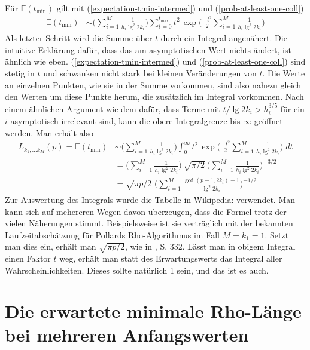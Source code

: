 \documentclass[a4paper, 11pt, ngerman]{article}
\newcommand{\E}{\mathbb{E}}
\begin{document}
Für $\E(t_{\min})$ gilt mit (\ref{expectation-tmin-intermed}) und (\ref{prob-at-least-one-coll})
\begin{align*}
    \E(t_{\min})
     & \sim \Bigg ( \sum_{i = 1}^M \frac 1 {h_i \lg^2 2k_i} \Bigg )
    \sum_{t = 0}^{t_{\max}} t^2 \, \exp \Bigg ( \frac {-t^2} 2
    \sum_{i = 1}^M \frac 1 {h_i \lg^2 2k_i} \Bigg )
\end{align*}
Als letzter Schritt wird die Summe über $t$ durch ein Integral angenähert. Die intuitive Erklärung dafür, dass das am asymptotischen Wert nichts ändert, ist ähnlich wie eben. (\ref{expectation-tmin-intermed}) und (\ref{prob-at-least-one-coll}) sind stetig in $t$ und schwanken nicht stark bei kleinen Veränderungen von $t$. Die Werte an einzelnen Punkten, wie sie in der Summe vorkommen, sind also nahezu gleich den Werten um diese Punkte herum, die zusätzlich im Integral vorkommen. Nach einem ähnlichen Argument wie dem dafür, dass Terme mit $t/\lg 2k_i > h_i^{3/5}$ für ein $i$ asymptotisch irrelevant sind, kann die obere Integralgrenze bis $\infty$ geöffnet werden. Man erhält also
\begin{align}
    L_{k_1, \dots k_M}(p) = \E(t_{\min})
     & \sim \Bigg ( \sum_{i = 1}^M \frac 1 {h_i \lg^2 2k_i} \Bigg )
    \int_{0}^{\infty} t^2 \, \exp \Bigg ( \frac {-t^2} 2
    \sum_{i = 1}^M \frac 1 {h_i \lg^2 2k_i} \Bigg ) \; dt
    \nonumber                                                       \\
     & = \Bigg (\sum_{i = 1}^M \frac 1 {h_i \lg^2 2k_i} \Bigg ) \,
    \sqrt {\pi / 2} \
    \Bigg ( \sum_{i = 1}^M \frac 1 {h_i \lg^2 2k_i} \Bigg )^{-3/2}
    \nonumber                                                       \\
     & = \sqrt{\pi p / 2} \; \Bigg (
    \sum_{i = 1}^M \frac {\gcd(p - 1, 2k_i) - 1} {\lg^2 2k_i} \Bigg )^{-1/2}
    \label{expectation-tmin}
\end{align}
Zur Auswertung des Integrals wurde die Tabelle in Wikipedia: \cite{gint} verwendet. Man kann sich auf mehereren Wegen davon überzeugen, dass die Formel trotz der vielen Näherungen stimmt. Beispielsweise ist sie verträglich mit der bekannten Laufzeitabschätzung für Pollards Rho-Algorithmus im Fall $M = k_1 = 1$. Setzt man dies ein, erhält man $\sqrt{\pi p / 2}$, wie in \cite{pol75}, S. 332. Lässt man in obigem Integral einen Faktor $t$ weg, erhält man statt des Erwartungswerts das Integral aller Wahrscheinlichkeiten. Dieses sollte natürlich 1 sein, und das ist es auch.

\section{Die erwartete minimale Rho-Länge bei mehreren Anfangswerten}
\end{document}
